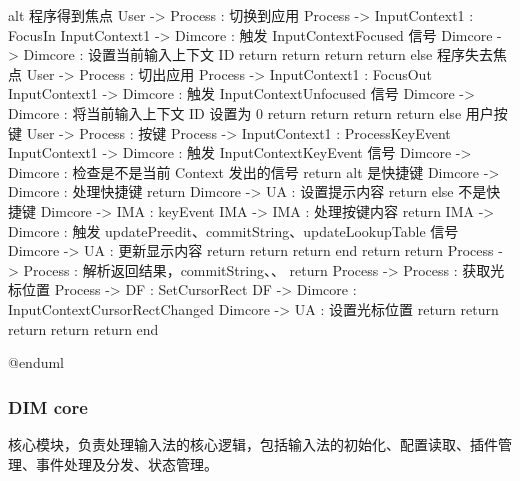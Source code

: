 \documentclass{utart}
\begin{document}
\begin{plantuml}
        alt 程序得到焦点
            User -> Process : 切换到应用
                Process -> InputContext1 : FocusIn
                    InputContext1 -> Dimcore : 触发 InputContextFocused 信号
                        Dimcore -> Dimcore : 设置当前输入上下文 ID
                        return
                    return
                return
            return
        else 程序失去焦点
            User -> Process : 切出应用
                Process -> InputContext1 : FocusOut
                    InputContext1 -> Dimcore : 触发 InputContextUnfocused 信号
                        Dimcore -> Dimcore : 将当前输入上下文 ID 设置为 0
                        return
                    return
                return
            return
        else 用户按键
            User -> Process : 按键
                Process -> InputContext1 : ProcessKeyEvent
                    InputContext1 -> Dimcore : 触发 InputContextKeyEvent 信号
                        Dimcore -> Dimcore : 检查是不是当前 Context 发出的信号
                        return
                        alt 是快捷键
                            Dimcore -> Dimcore : 处理快捷键
                            return
                            Dimcore -> UA : 设置提示内容
                            return
                        else 不是快捷键
                            Dimcore -> IMA : keyEvent
                                IMA -> IMA : 处理按键内容
                                return
                                IMA -> Dimcore : 触发 updatePreedit、commitString、updateLookupTable 信号
                                    Dimcore -> UA : 更新显示内容
                                    return
                                return
                            return
                        end
                    return
                return
                Process -> Process : 解析返回结果， commitString、\nupdatePreedit、\nforwardKey
                return
                Process -> Process : 获取光标位置
                    Process -> DF : SetCursorRect
                        DF -> Dimcore : InputContextCursorRectChanged
                            Dimcore -> UA : 设置光标位置
                            return
                        return
                    return
                return
            return
        end

        @enduml
        \end{plantuml}

        \subsubsection{DIM core}
            \par 核心模块，负责处理输入法的核心逻辑，包括输入法的初始化、配置读取、插件管理、事件处理及分发、状态管理。
\end{document}
